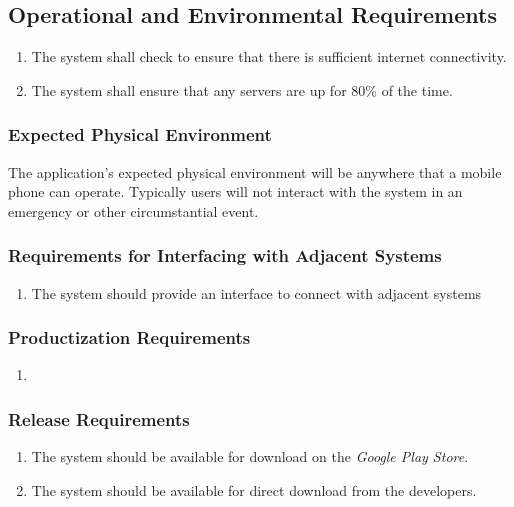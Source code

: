\documentclass[titlepage]{article}
\begin{document}
		
		\subsection{Operational and Environmental Requirements}
		\label{sub:operational_and_environmental_requirements}
		\begin{enumerate}
			\item
			The system shall check to ensure that there is sufficient internet connectivity.
			\item
			The system shall ensure that any servers are up for 80\% of the time.
		\end{enumerate}
		
		\subsubsection{Expected Physical Environment}
		\label{ssub:expected_physical_environment}
		The application's expected physical environment will be anywhere that a mobile phone can operate. Typically users will not interact with the system in an emergency or other circumstantial event.
		
		\subsubsection{Requirements for Interfacing with Adjacent Systems}
		\label{ssub:requirements_for_interfacing_with_adjacent_systems}
		\begin{enumerate}[{OE}1. ]
			\item 
			The system should provide an interface to connect with adjacent systems 
		\end{enumerate}
		
		\subsubsection{Productization Requirements}
		\label{ssub:productization_requirements}
		\begin{enumerate}[{OE}1. ]
			\item 
		\end{enumerate}
		
		\subsubsection{Release Requirements}
		\label{ssub:release_requirements}
		\begin{enumerate}[{OE}1. ]
			\item 
			The system should be available for download on the \textit{Google Play Store}.
			\item
			The system should be available for direct download from the developers.
		\end{enumerate}
		
\end{document}
